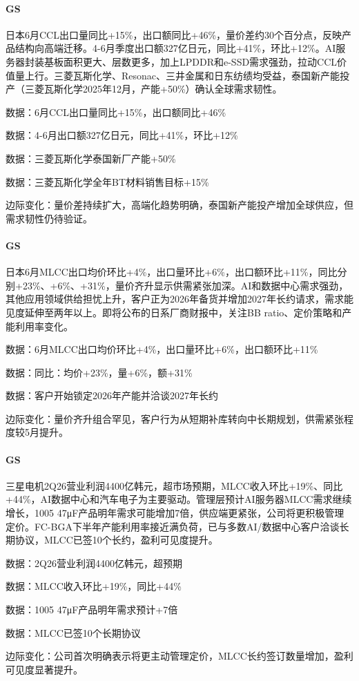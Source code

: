 \documentclass[11pt]{ctexart}
\begin{document}
\paragraph{GS} 日本6月CCL出口量同比+15\%，出口额同比+46\%，量价差约30个百分点，反映产品结构向高端迁移。4-6月季度出口额327亿日元，同比+41\%，环比+12\%。AI服务器封装基板面积更大、层数更多，加上LPDDR和e-SSD需求强劲，拉动CCL价值量上行。三菱瓦斯化学、Resonac、三井金属和日东纺绩均受益，泰国新产能投产（三菱瓦斯化学2025年12月，产能+50\%）确认全球需求韧性。
{\small\color{refgray}数据：6月CCL出口量同比+15\%，出口额同比+46\%\par}
{\small\color{refgray}数据：4-6月出口额327亿日元，同比+41\%，环比+12\%\par}
{\small\color{refgray}数据：三菱瓦斯化学泰国新厂产能+50\%\par}
{\small\color{refgray}数据：三菱瓦斯化学全年BT材料销售目标+15\%\par}
{\small\color{refgray}边际变化：量价差持续扩大，高端化趋势明确，泰国新产能投产增加全球供应，但需求韧性仍待验证。\par}
\paragraph{GS} 日本6月MLCC出口均价环比+4\%，出口量环比+6\%，出口额环比+11\%，同比分别+23\%、+6\%、+31\%，量价齐升显示供需紧张加深。AI和数据中心需求强劲，其他应用领域供给担忧上升，客户正为2026年备货并增加2027年长约请求，需求能见度延伸至两年以上。即将公布的日系厂商财报中，关注BB ratio、定价策略和产能利用率变化。
{\small\color{refgray}数据：6月MLCC出口均价环比+4\%，出口量环比+6\%，出口额环比+11\%\par}
{\small\color{refgray}数据：同比：均价+23\%，量+6\%，额+31\%\par}
{\small\color{refgray}数据：客户开始锁定2026年产能并洽谈2027年长约\par}
{\small\color{refgray}边际变化：量价齐升组合罕见，客户行为从短期补库转向中长期规划，供需紧张程度较5月提升。\par}
\paragraph{GS} 三星电机2Q26营业利润4400亿韩元，超市场预期，MLCC收入环比+19\%、同比+44\%，AI数据中心和汽车电子为主要驱动。管理层预计AI服务器MLCC需求继续增长，1005 47μF产品明年需求可能增加7倍，供应端更紧张，公司将更积极管理定价。FC-BGA下半年产能利用率接近满负荷，已与多数AI/数据中心客户洽谈长期协议，MLCC已签10个长约，盈利可见度提升。
{\small\color{refgray}数据：2Q26营业利润4400亿韩元，超预期\par}
{\small\color{refgray}数据：MLCC收入环比+19\%，同比+44\%\par}
{\small\color{refgray}数据：1005 47μF产品明年需求预计+7倍\par}
{\small\color{refgray}数据：MLCC已签10个长期协议\par}
{\small\color{refgray}边际变化：公司首次明确表示将更主动管理定价，MLCC长约签订数量增加，盈利可见度显著提升。\par}
\end{document}
